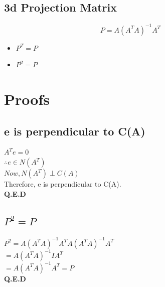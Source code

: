 \documentclass[]{article}
\begin{document}
\subsection{3d Projection Matrix}
\vspace{10pt}

\begin{equation}
	P=A{(A^TA)}^{-1}A^T
\end{equation}
\vspace{10pt}
\begin{mytheorem}[title=Properties of 3d projection matrix]
	\begin{itemize}
		\item $P^T=P$
		\item $P^2=P$
	\end{itemize}
	
\end{mytheorem}

\vspace{10pt}
\section{Proofs}
\vspace{10pt}

\subsection{e is perpendicular to C(A)}
\vspace{10pt}
$A^Te=0$\\

$\therefore e \in N(A^T)$\\

$Now, N(A^T) \perp C(A)$\\

Therefore, e is perpendicular to C(A).\\

\textbf{Q.E.D}

\vspace{10pt}

\subsection{$P^2=P$}
\vspace{10pt}

$P^2=A{(A^TA)}^{-1}A^TA{(A^TA)}^{-1}A^T$\\

$=A{(A^TA)}^{-1}IA^T$\\

$=A{(A^TA)}^{-1}A^T=P$\\

\textbf{Q.E.D}
\end{document}

